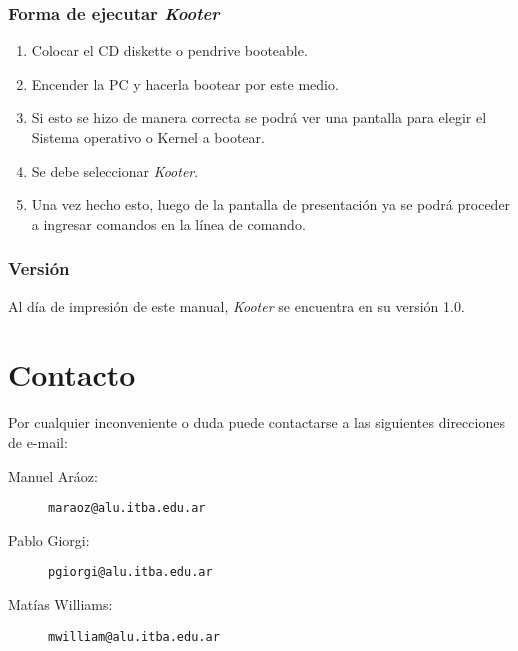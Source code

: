 \documentclass[a4paper,11pt]{article}
\begin{document}
\subsubsection{Forma de ejecutar \emph{Kooter}}
\begin{enumerate}
	\item Colocar el CD diskette o pendrive booteable.
	\item Encender la PC y hacerla bootear por este medio.
	\item Si esto se hizo de manera correcta se podrá ver una pantalla para elegir el Sistema operativo o Kernel a bootear.
	\item Se debe seleccionar \emph{Kooter}.
	\item Una vez hecho esto, luego de la pantalla de presentación ya se podrá proceder a ingresar comandos en la línea de comando.
\end{enumerate}

\subsubsection{Versión}
Al día de impresión de este manual, \emph{Kooter} se encuentra en su versión 1.0.

\newpage

\section{Contacto}
Por cualquier inconveniente o duda puede contactarse a las siguientes direcciones de e-mail:
\begin{description}
	\item[Manuel Aráoz:]  \texttt{maraoz@alu.itba.edu.ar}
	\item[Pablo Giorgi:]  \texttt{pgiorgi@alu.itba.edu.ar}
	\item[Matías Williams:]  \texttt{mwilliam@alu.itba.edu.ar}
\end{description}
\end{document}

